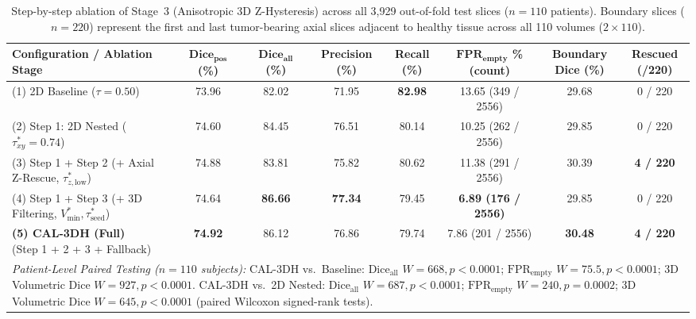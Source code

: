 \documentclass[preprint,12pt,authoryear]{elsarticle}
\begin{document}
\begin{table}[tbp]
\centering
\caption{Step-by-step ablation of Stage~3 (Anisotropic 3D Z-Hysteresis) across all 3,929 out-of-fold test slices ($n=110$ patients). Boundary slices ($n=220$) represent the first and last tumor-bearing axial slices adjacent to healthy tissue across all 110 volumes ($2 \times 110$).}
\label{tab:method_comparison}
\setlength{\tabcolsep}{2.0pt}
\renewcommand{\arraystretch}{1.10}
\scriptsize
\begin{tabular*}{\textwidth}{@{\extracolsep{\fill}}lccccccc}
\toprule
\textbf{Configuration / Ablation Stage} & \shortstack{$\mathbf{\text{Dice}_{\text{pos}}}$ \\ \textbf{(\%)}} & \shortstack{$\mathbf{\text{Dice}_{\text{all}}}$ \\ \textbf{(\%)}} & \shortstack{\textbf{Precision} \\ \textbf{(\%)}} & \shortstack{\textbf{Recall} \\ \textbf{(\%)}} & \shortstack{$\mathbf{\text{FPR}_{\text{empty}}}$ \\ \textbf{\% (count)}} & \shortstack{\textbf{Boundary} \\ \textbf{Dice (\%)}} & \shortstack{\textbf{Rescued} \\ \textbf{(/220)}} \\
\midrule
\shortstack[l]{(1) 2D Baseline \\ \phantom{(1) }($\tau = 0.50$)} & 73.96 & 82.02 & 71.95 & \textbf{82.98} & 13.65 (349 / 2556) & 29.68 & 0 / 220 \\
\shortstack[l]{(2) Step 1: 2D Nested \\ \phantom{(2) }($\tau_{xy}^* = 0.74$)} & 74.60 & 84.45 & 76.51 & 80.14 & 10.25 (262 / 2556) & 29.85 & 0 / 220 \\
\shortstack[l]{(3) Step 1 + Step 2 \\ \phantom{(3) }(+ Axial Z-Rescue, $\tau_{z,\mathrm{low}}^*$)} & 74.88 & 83.81 & 75.82 & 80.62 & 11.38 (291 / 2556) & 30.39 & \textbf{4 / 220} \\
\shortstack[l]{(4) Step 1 + Step 3 \\ \phantom{(4) }(+ 3D Filtering, $V_{\min}^*, \tau_{\mathrm{seed}}^*$)} & 74.64 & \textbf{86.66} & \textbf{77.34} & 79.45 & \textbf{6.89 (176 / 2556)} & 29.85 & 0 / 220 \\
\shortstack[l]{\textbf{(5) CAL-3DH (Full)} \\ \phantom{(5) }(Step 1 + 2 + 3 + Fallback)} & \textbf{74.92} & 86.12 & 76.86 & 79.74 & 7.86 (201 / 2556) & \textbf{30.48} & \textbf{4 / 220} \\
\midrule
\multicolumn{8}{p{0.96\textwidth}}{\textit{Patient-Level Paired Testing ($n=110$ subjects):} CAL-3DH vs.\ Baseline: $\text{Dice}_{\text{all}}$ $W=668, p < 0.0001$; $\text{FPR}_{\text{empty}}$ $W=75.5, p < 0.0001$; 3D Volumetric Dice $W=927, p < 0.0001$. CAL-3DH vs.\ 2D Nested: $\text{Dice}_{\text{all}}$ $W=687, p < 0.0001$; $\text{FPR}_{\text{empty}}$ $W=240, p = 0.0002$; 3D Volumetric Dice $W=645, p < 0.0001$ (paired Wilcoxon signed-rank tests).} \\
\bottomrule
\end{tabular*}
\end{table}
\end{document}
